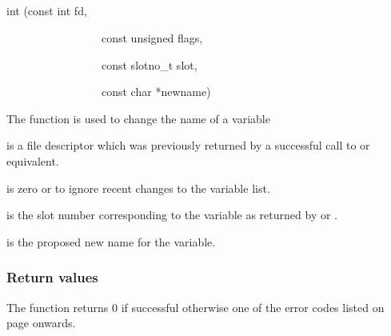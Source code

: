\subsection{\funcnameXBvarrename{}}

\begin{expara}

int \funcnameXBvarrename{}(const int fd,

\ \ \ \ \ \ \ \ \ \ \ \ \ \ \ \ \ const unsigned flags,

\ \ \ \ \ \ \ \ \ \ \ \ \ \ \ \ \ const slotno\_t slot,

\ \ \ \ \ \ \ \ \ \ \ \ \ \ \ \ \ const char *newname)

\end{expara}

The function \funcXBvarrename{} is used to change the
name of a variable

 is a file descriptor which was previously
returned by a successful call to \funcXBopen{} or equivalent.

 is zero or
 to ignore recent changes to
the variable list.

 is the slot number corresponding to the
variable as returned by \funcXBvarlist{} or
\funcXBvarfindslot{}.

 is the proposed new name for the
variable.

\subsubsection{Return values}
The function returns 0 if successful otherwise one of the error codes
listed on page \pageref{errorcodes} onwards.

